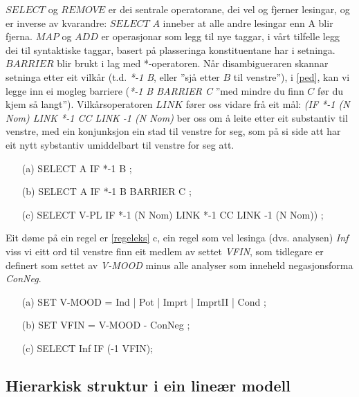 \documentclass[a4paper,norsk]{article}
\begin{document}
$SELECT$ og $REMOVE$ er dei sentrale operatorane, dei vel og fjerner lesingar, og er inverse av kvarandre: $SELECT$ $A$ inneber at alle andre lesingar enn A blir fjerna. $MAP$ og $ADD$ er operasjonar som legg til nye taggar, i vårt tilfelle legg dei til syntaktiske taggar, basert på plasseringa konstituentane har i setninga. $BARRIER$ blir brukt i lag med *-operatoren. Når disambigueraren skannar setninga etter eit vilkår (t.d. \textit{*-1 B}, eller ''sjå etter $B$ til venstre''), i \ref{ped}, kan vi legge inn ei mogleg barriere  (\textit{*-1 B BARRIER C} ''med mindre du finn $C$ før du kjem så langt''). Vilkårsoperatoren $LINK$ fører oss vidare frå eit mål: \textit{(IF *-1 (N Nom) LINK *-1 CC LINK -1 (N Nom)} ber oss om å leite etter eit substantiv til venstre, med ein konjunksjon ein stad til venstre for seg, som på si side att har eit nytt sybstantiv umiddelbart til venstre for seg att.%

\begin{example}\label{ped}
\begin{itemize}
\item[(a)] SELECT A IF *-1 B ;
\item[(b)] SELECT A IF *-1 B BARRIER C ;
\item[(c)] SELECT V-PL IF *-1 (N Nom) LINK *-1 CC LINK -1 (N Nom)) ;
\end{itemize}
\end{example}

Eit døme på ein regel er \ref{regeleks} c, ein regel som vel lesinga (dvs. analysen) \emph{Inf} viss vi eitt ord til venstre finn eit medlem av settet \emph{VFIN}, som  tidlegare er definert som settet av \emph{V-MOOD} minus alle analyser som inneheld negasjonsforma \emph{ConNeg}.%

\begin{example}\label{regeleks}
\begin{itemize}
\item[(a)] SET V-MOOD = Ind | Pot | Imprt | ImprtII | Cond ; 
\item[(b)] SET VFIN  =  V-MOOD - ConNeg ; 
\item[(c)] SELECT Inf IF (-1 VFIN); 
\end{itemize}
\end{example}%

\subsection{Hierarkisk struktur i ein lineær modell}
\end{document}
